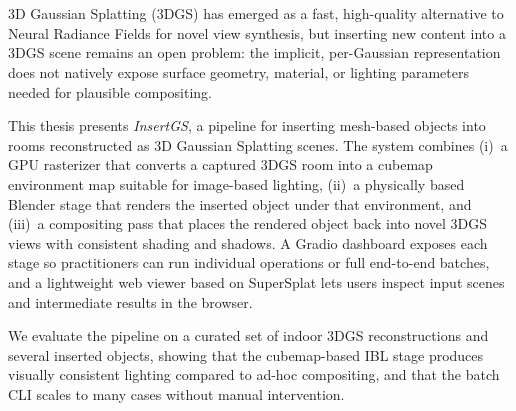 \chapter{\abstractname}

3D Gaussian Splatting (3DGS) has emerged as a fast, high-quality alternative
to Neural Radiance Fields for novel view synthesis, but inserting new content
into a 3DGS scene remains an open problem: the implicit, per-Gaussian
representation does not natively expose surface geometry, material, or
lighting parameters needed for plausible compositing.

This thesis presents \emph{InsertGS}, a pipeline for inserting mesh-based
objects into rooms reconstructed as 3D Gaussian Splatting scenes. The system
combines (i)~a GPU rasterizer that converts a captured 3DGS room into a
cubemap environment map suitable for image-based lighting, (ii)~a physically
based Blender stage that renders the inserted object under that environment,
and (iii)~a compositing pass that places the rendered object back into novel
3DGS views with consistent shading and shadows. A Gradio dashboard exposes
each stage so practitioners can run individual operations or full
end-to-end batches, and a lightweight web viewer based on SuperSplat lets
users inspect input scenes and intermediate results in the browser.

We evaluate the pipeline on a curated set of indoor 3DGS reconstructions and
several inserted objects, showing that the cubemap-based IBL stage produces
visually consistent lighting compared to ad-hoc compositing, and that the
batch CLI scales to many cases without manual intervention.
